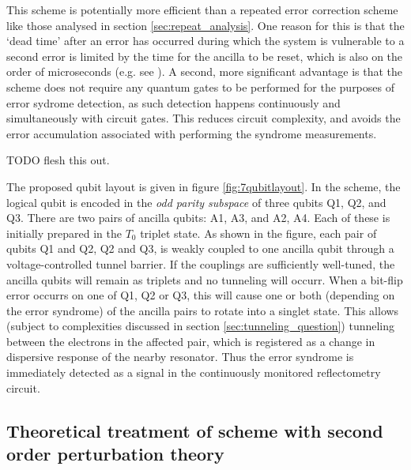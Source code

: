 \documentclass{report}
\begin{document}
This scheme is potentially more efficient than a repeated error correction scheme like those analysed in section \ref{sec:repeat_analysis}. One reason for this is that the `dead time' after an error has occurred during which the system is vulnerable to a second error is limited by the time for the ancilla to be reset, which is also on the order of microseconds (e.g. see \cite{Nakajima2019}). A second, more significant advantage is that the scheme does not require any quantum gates to be performed for the purposes of error sydrome detection, as such detection happens continuously and simultaneously with circuit gates. This reduces circuit complexity, and avoids the error accumulation associated with performing the syndrome measurements. 

TODO flesh this out.



The proposed qubit layout is given in figure \ref{fig:7qubitlayout}. In the scheme, the logical qubit is encoded in the \textit{odd parity subspace} of three qubits Q1, Q2, and Q3. There are two pairs of ancilla qubits: A1, A3, and A2, A4. Each of these is initially prepared in the $T_0$ triplet state. As shown in the figure, each pair of qubits Q1 and Q2, Q2 and Q3, is weakly coupled to one ancilla qubit through a voltage-controlled tunnel barrier. If the couplings are sufficiently well-tuned, the ancilla qubits will remain as triplets and no tunneling will occurr. When a bit-flip error occurrs on one of Q1, Q2 or Q3, this will cause one or both (depending on the error syndrome) of the ancilla pairs to rotate into a singlet state. This allows (subject to complexities discussed in section \ref{sec:tunneling_question}) tunneling between the electrons in the affected pair, which is registered as a change in dispersive response of the nearby resonator. Thus the error syndrome is immediately detected as a signal in the continuously monitored reflectometry circuit.

\subsection{Theoretical treatment of scheme with second order perturbation theory}
\end{document}
